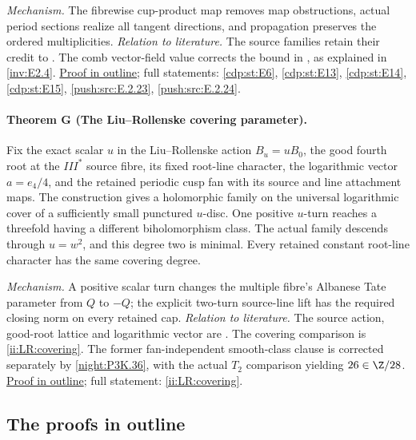 \textit{Mechanism.} The fibrewise cup-product map removes map
obstructions, actual period sections realize all tangent
directions, and propagation preserves the ordered multiplicities.
\textit{Relation to literature.} The source families retain their
credit to \cite{Viaclovsky2026Two,LiuRollenske2026,Viaclovsky2026Combs}.
The comb vector-field value corrects the bound in
\cite[Corollary~1.3, p.~2]{HKP2000}, as explained in
\ref{inv:E2.4}.
\hyperlink{outline-II-F}{Proof in outline}; full statements:
\ref{cdp:st:E6}, \ref{cdp:st:E13}, \ref{cdp:st:E14},
\ref{cdp:st:E15}, \ref{push:src:E.2.23}, \ref{push:src:E.2.24}.

\hypertarget{main-II-G}{}
\paragraph{Theorem G (The Liu--Rollenske covering parameter).}
\label{series:II:G}
Fix the exact scalar $u$ in the Liu--Rollenske action $B_u=uB_0$,
the good fourth root at the $III^*$ source fibre, its fixed
root-line character, the logarithmic vector $a=e_4/4$, and the
retained periodic cusp fan with its source and line attachment
maps. The construction gives a holomorphic family on the universal
logarithmic cover of a sufficiently small punctured $u$-disc.
One positive $u$-turn reaches a threefold having a different
biholomorphism class. The actual family descends through
$u=w^2$, and this degree two is minimal. Every retained constant
root-line character has the same covering degree.

\textit{Mechanism.} A positive scalar turn changes the multiple
fibre's Albanese Tate parameter from $Q$ to $-Q$; the explicit
two-turn source-line lift has the required closing norm on every
retained cap.
\textit{Relation to literature.} The source action, good-root
lattice and logarithmic vector are
\cite[Lemma~2.7, Corollary~2.8, pp.~6--7; Proposition~3.6 and
Definition~3.7, pp.~9--10 of the attached-source edition]{LiuRollenske2026}.
The covering comparison is \ref{ii:LR:covering}. The former
fan-independent smooth-class clause is corrected separately by
\ref{night:P3K.36}, with the actual $T_2$ comparison yielding
$26\in\Z/28$.
\hyperlink{outline-II-G}{Proof in outline}; full statement:
\ref{ii:LR:covering}.

\subsection{The proofs in outline}
\label{series:II:outline}

